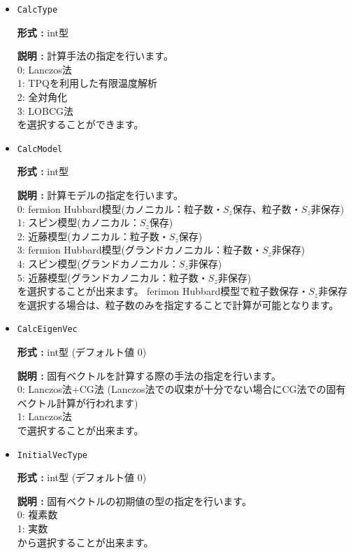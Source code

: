 \begin{itemize}
\item  \verb|CalcType|

{\bf 形式 :} int型 

{\bf 説明 :} 計算手法の指定を行います。\\
0: Lanczos法\\
1: TPQを利用した有限温度解析\\
2: 全対角化\\
3: LOBCG法\\
を選択することができます。

\item  \verb|CalcModel|

{\bf 形式 :} int型 

{\bf 説明 :} 計算モデルの指定を行います。\\
0: fermion Hubbard模型(カノニカル：粒子数・$S_z$保存、{粒子数・$S_z$非保存})\\
1: スピン模型(カノニカル：$S_z$保存)\\
2: 近藤模型(カノニカル：粒子数・$S_z$保存)\\
3: fermion Hubbard模型(グランドカノニカル：粒子数・$S_z$非保存)\\
4: スピン模型(グランドカノニカル：$S_z$非保存)\\
5: 近藤模型(グランドカノニカル：粒子数・$S_z$非保存)\\
を選択することが出来ます。
{ferimon Hubbard模型で粒子数保存・$S_z$非保存を選択する場合は、粒子数のみを指定することで計算が可能となります。}

\item  \verb|CalcEigenVec|

{\bf 形式 :} int型 (デフォルト値 0)

{\bf 説明 :} 固有ベクトルを計算する際の手法の指定を行います。\\
0: Lanczos法+CG法 (Lanczos法での収束が十分でない場合にCG法での固有ベクトル計算が行われます)\\
1: Lanczos法\\
で選択することが出来ます。

\item  \verb|InitialVecType|

{\bf 形式 :} int型 (デフォルト値 0)

{\bf 説明 :} 固有ベクトルの初期値の型の指定を行います。\\
0: 複素数\\
1: 実数\\
から選択することが出来ます。


\end{itemize}
